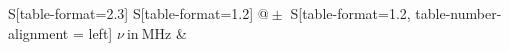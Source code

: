 \begin{table}
    \centering
    \caption{Bei der Regression verwendete Werte}
    \label{tab:Regression}
    \begin{tabular}{
	S[table-format=2.3]
	S[table-format=1.2]
	@{${}\pm{}$}
	S[table-format=1.2, table-number-alignment = left]
	}
	\toprule
	{$\nu \ \mathrm{in} \ \si{\mega\hertz}$}		& 		\\ 
	\midrule
    
    \bottomrule
    \end{tabular}
    \end{table}
